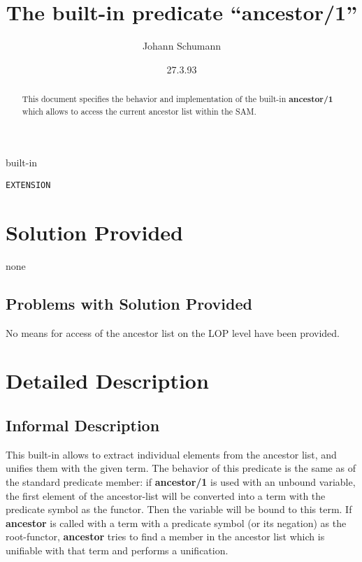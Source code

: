 

\title{The built-in predicate ``ancestor/1''}
\author{Johann Schumann}
\date{27.3.93}



\maketitle

\begin{abstract}
This document specifies the behavior and implementation of the built-in
{\bf ancestor/1} which allows to access the current ancestor list within
the SAM.
\end{abstract}

  built-in 

 {\tt EXTENSION}

\section{Solution Provided}

none

\subsection{Problems with Solution Provided}
	
No means for access of the ancestor list on the LOP level
have been provided.


\section{Detailed Description}

\subsection{Informal Description}

This built-in allows to extract individual elements from the
ancestor list, and unifies them with the given term.
The behavior of this predicate is the same as of the standard predicate
member: if {\bf ancestor/1} is used with an unbound variable, the
first element of the ancestor-list will be converted into a term
with the predicate symbol as the functor. Then the variable will be
bound to this term.
If {\bf ancestor} is called with a term with a predicate symbol
(or its negation) as the root-functor, {\bf ancestor} tries to
find a member in the ancestor list which is unifiable with that term
and performs a unification.


